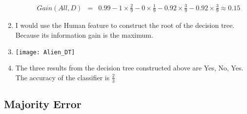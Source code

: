 \documentclass{article}[12pt]
\begin{document}
\begin{enumerate}
\begin{enumerate}
\begin{eqnarray}
                        Gain(All, D) &=& 0.99 - 1\times\frac{2}{9} - 0\times\frac{1}{9} - 0.92 \times\frac{3}{9} - 0.92\times\frac{3}{9} \approx 0.15\nonumber 
                    \end{eqnarray}
                \end{enumerate}
            \item I would use the Human feature to construct the root of the decision tree. Because its information gain is the maximum.
            \item 
                \texttt{[image: Alien\_DT]}
            \item The three results from the decision tree constructed above are Yes, No, Yes. The accuracy of the classifier is $\frac{2}{3}$
        \end{enumerate}
	\subsection{Majority Error}
\end{document}

